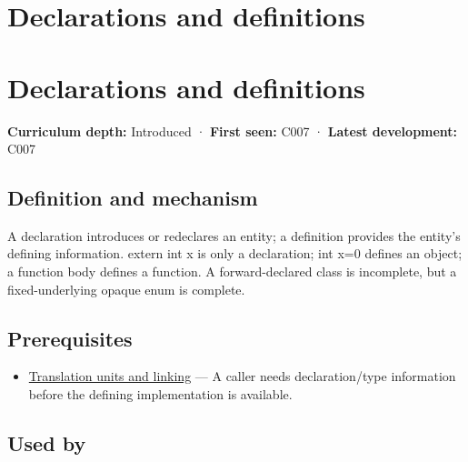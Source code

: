 \hypertarget{appendix-2e4d494c2d94}{}
\section*{Declarations and definitions}
\section{Declarations and definitions}\label{appendix-2e4d494c2d94-declarations-and-definitions}

\textbf{Curriculum depth:} Introduced · \textbf{First seen:} C007 · \textbf{Latest development:} C007

\subsection{Definition and mechanism}\label{appendix-2e4d494c2d94-definition-and-mechanism}

A declaration introduces or redeclares an entity; a definition provides the entity's defining information. extern int x is only a declaration; int x=0 defines an object; a function body defines a function. A forward-declared class is incomplete, but a fixed-underlying opaque enum is complete.

\subsection{Prerequisites}\label{appendix-2e4d494c2d94-prerequisites}

\begin{itemize}
\tightlist
\item
  \hyperref[appendix-806686359e1b]{Translation units and linking} --- A caller needs declaration/type information before the defining implementation is available.
\end{itemize}

\subsection{Used by}\label{appendix-2e4d494c2d94-used-by}

